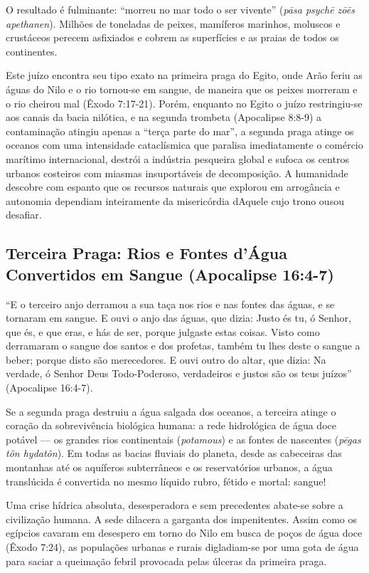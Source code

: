 \documentclass[11pt,a4paper,openany]{book}
\begin{document}
O resultado é fulminante: ``morreu no mar todo o ser vivente'' (\textit{pāsa psychē zōēs apethanen}). Milhões de toneladas de peixes, mamíferos marinhos, moluscos e crustáceos perecem asfixiados e cobrem as superfícies e as praias de todos os continentes.

Este juízo encontra seu tipo exato na primeira praga do Egito, onde Arão feriu as águas do Nilo e o rio tornou-se em sangue, de maneira que os peixes morreram e o rio cheirou mal (Êxodo 7:17-21). Porém, enquanto no Egito o juízo restringiu-se aos canais da bacia nilótica, e na segunda trombeta (Apocalipse 8:8-9) a contaminação atingiu apenas a ``terça parte do mar'', a segunda praga atinge os oceanos com uma intensidade cataclísmica que paralisa imediatamente o comércio marítimo internacional, destrói a indústria pesqueira global e sufoca os centros urbanos costeiros com miasmas insuportáveis de decomposição. A humanidade descobre com espanto que os recursos naturais que explorou em arrogância e autonomia dependiam inteiramente da misericórdia dAquele cujo trono ousou desafiar.



\subsection{Terceira Praga: Rios e Fontes d'Água Convertidos em Sangue (Apocalipse 16:4-7)}


``E o terceiro anjo derramou a sua taça nos rios e nas fontes das águas, e se tornaram em sangue. E ouvi o anjo das águas, que dizia: Justo és tu, ó Senhor, que és, e que eras, e hás de ser, porque julgaste estas coisas. Visto como derramaram o sangue dos santos e dos profetas, também tu lhes deste o sangue a beber; porque disto são merecedores. E ouvi outro do altar, que dizia: Na verdade, ó Senhor Deus Todo-Poderoso, verdadeiros e justos são os teus juízos'' (Apocalipse 16:4-7).

Se a segunda praga destruiu a água salgada dos oceanos, a terceira atinge o coração da sobrevivência biológica humana: a rede hidrológica de água doce potável — os grandes rios continentais (\textit{potamous}) e as fontes de nascentes (\textit{pēgas tôn hydatôn}). Em todas as bacias fluviais do planeta, desde as cabeceiras das montanhas até os aquíferos subterrâneos e os reservatórios urbanos, a água translúcida é convertida no mesmo líquido rubro, fétido e mortal: sangue!

Uma crise hídrica absoluta, desesperadora e sem precedentes abate-se sobre a civilização humana. A sede dilacera a garganta dos impenitentes. Assim como os egípcios cavaram em desespero em torno do Nilo em busca de poços de água doce (Êxodo 7:24), as populações urbanas e rurais digladiam-se por uma gota de água para saciar a queimação febril provocada pelas úlceras da primeira praga.
\end{document}
